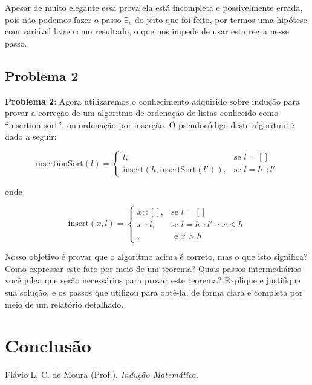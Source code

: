 \documentclass[a4paper, 10pt]{article}
\begin{document}
Apesar de muito elegante essa prova ela está incompleta e possivelmente errada, pois não podemos fazer o passo $\exists_e$ do jeito que foi feito, por termos uma hipótese com variável livre como resultado, o que nos impede de usar esta regra nesse passo. 

\subsection{Problema 2}

\textbf{Problema 2}: Agora utilizaremos o conhecimento adquirido sobre indução para provar a correção de um algoritmo de ordenação de listas conhecido como ``insertion sort'', ou ordenação por inserção. O pseudocódigo deste algoritmo é dado a seguir:

    \begin{equation*}
        \textrm{insertionSort}(l) =
        \left\{
      \begin{array}{ll}
        l, & \textrm{se } l = [] \\
        \textrm{insert}(h, \textrm{insertSort}(l')), & \textrm{se } l = h :: l'
      \end{array}
    \right.
    \end{equation*}
		
onde 

    \begin{equation*}
        \textrm{insert}(x,l) =
        \left\{
      \begin{array}{ll}
        x::[], & \textrm{se } l = [] \\
        x::l, & \textrm{se } l = h::l' \textrm{ e } x \leq h \\
        , & \textrm{ e } x > h 
      \end{array}
    \right.
    \end{equation*}

Nosso objetivo é provar que o algoritmo acima é correto, mas o que isto significa? Como expressar este fato por meio de um teorema? Quais passos intermediários você julga que serão necessários para provar este teorema? Explique e justifique sua solução, e os passos que utilizou para obtê-la, de forma clara e completa por meio de um relatório detalhado\cite{Apostila}.


\section{Conclusão}

\begin{thebibliography}{9}

Flávio L. C. de Moura (Prof.).
\textit{Indução Matemática}.


\end{thebibliography}

\end{document}
